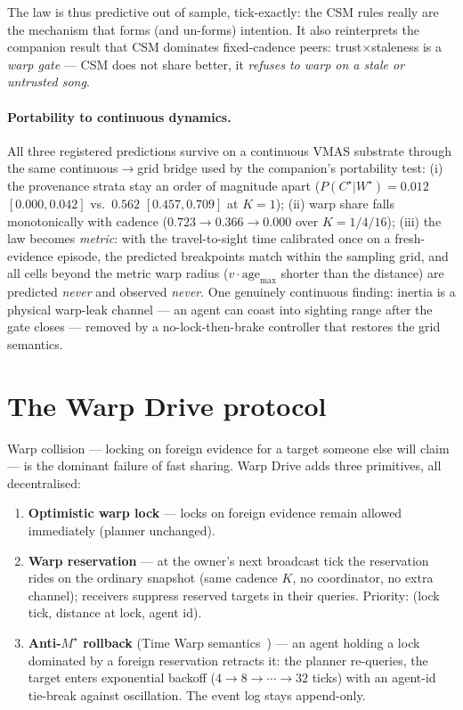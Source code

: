 \documentclass{article}
\newcommand{\wstar}{W^{\star}}
\newcommand{\mstar}{M^{\star}}
\newcommand{\cstar}{C^{\star}}
\begin{document}
The law is thus predictive out of sample, tick-exactly: the CSM rules
really are the mechanism that forms (and un-forms) intention. It also
reinterprets the companion result that CSM dominates fixed-cadence
peers: trust$\times$staleness is a \emph{warp gate} --- CSM does not
share better, it \emph{refuses to warp on a stale or untrusted song}.

\paragraph{Portability to continuous dynamics.} All three registered
predictions survive on a continuous VMAS substrate through the same
continuous$\to$grid bridge used by the companion's portability test:
(i) the provenance strata stay an order of magnitude apart
($P(\cstar|\wstar)=0.012$ $[0.000,0.042]$ vs.\ $0.562$
$[0.457,0.709]$ at $K{=}1$); (ii) warp share falls monotonically with
cadence ($0.723\to0.366\to0.000$ over $K{=}1/4/16$); (iii) the law
becomes \emph{metric}: with the travel-to-sight time calibrated once
on a fresh-evidence episode, the predicted breakpoints match within
the sampling grid, and all cells beyond the metric warp radius
($v\cdot\mathrm{age}_{\max}$ shorter than the distance) are predicted
\emph{never} and observed \emph{never}. One genuinely continuous
finding: inertia is a physical warp-leak channel --- an agent can
coast into sighting range after the gate closes --- removed by a
no-lock-then-brake controller that restores the grid semantics.

\section{The Warp Drive protocol}
\label{p2:sec:drive}

Warp collision --- locking on foreign evidence for a target someone
else will claim --- is the dominant failure of fast sharing. Warp
Drive adds three primitives, all decentralised:

\begin{enumerate}[leftmargin=20pt,itemsep=2pt,topsep=2pt]
\item \textbf{Optimistic warp lock} --- locks on foreign evidence
  remain allowed immediately (planner unchanged).
\item \textbf{Warp reservation} --- at the owner's next broadcast tick
  the reservation rides on the ordinary snapshot (same cadence $K$, no
  coordinator, no extra channel); receivers suppress reserved targets
  in their queries. Priority: (lock tick, distance at lock, agent id).
\item \textbf{Anti-$\mstar$ rollback} (Time Warp
  semantics~\cite{jefferson1985}) --- an agent holding a lock
  dominated by a foreign reservation retracts it: the planner
  re-queries, the target enters exponential backoff
  ($4\to8\to\cdots\to32$ ticks) with an agent-id tie-break against
  oscillation. The event log stays append-only.
\end{enumerate}
\end{document}
